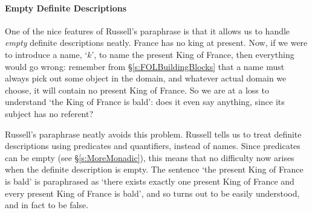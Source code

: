 \paragraph{Empty Definite Descriptions}
One of the nice features of Russell's paraphrase is that it allows us to handle \emph{empty} definite descriptions neatly. France has no king at present. Now, if we were to introduce a name, `$k$', to name the present King of France, then everything would go wrong: remember from §\ref{s:FOLBuildingBlocks} that a name must always pick out some object in the domain, and whatever actual domain we choose, it will contain no present King of France. So we are at a loss to understand `the King of France is bald': does it even say anything, since its subject has no referent?

Russell's paraphrase neatly avoids this problem. Russell tells us to treat definite descriptions using predicates and quantifiers, instead of names. Since predicates can be empty (see §\ref{s:MoreMonadic}), this means that no difficulty now arises when the definite description is empty. The sentence `the present King of France is bald' is paraphrased as `there exists exactly one present King of France and every present King of France is bald', and so turns out to be easily understood, and in fact to be false.

